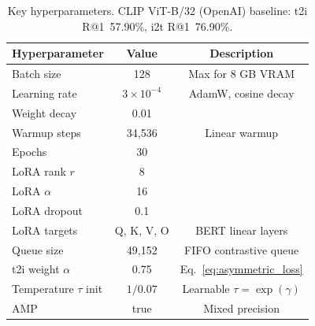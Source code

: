 \documentclass[10pt,leqno]{amsart}
\begin{document}
\begin{table}[h]
\centering
\caption{Key hyperparameters. CLIP ViT-B/32 (OpenAI) baseline: t2i R@1~57.90\%, i2t R@1~76.90\%.}
\label{tab:hyperparams}
\begin{tabular}{lcc}
\toprule
Hyperparameter & Value & Description \\
\midrule
Batch size & 128 & Max for 8 GB VRAM \\
Learning rate & $3\times10^{-4}$ & AdamW, cosine decay \\
Weight decay & 0.01 & \\
Warmup steps & 34,536 & Linear warmup \\
Epochs & 30 & \\
\midrule
LoRA rank $r$ & 8 & \\
LoRA $\alpha$ & 16 & \\
LoRA dropout & 0.1 & \\
LoRA targets & Q, K, V, O & BERT linear layers \\
\midrule
Queue size & 49,152 & FIFO contrastive queue \\
t2i weight $\alpha$ & 0.75 & Eq.~\ref{eq:asymmetric_loss} \\
Temperature $\tau$ init & $1/0.07$ & Learnable $\tau=\exp(\gamma)$ \\
\midrule
AMP & true & Mixed precision \\
\bottomrule
\end{tabular}
\end{table}
\end{document}
